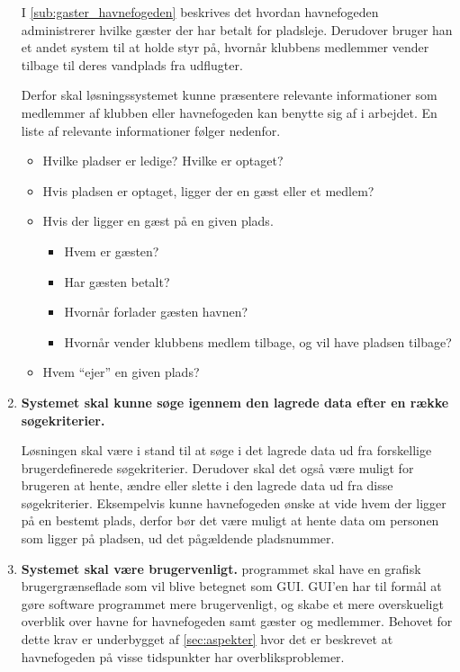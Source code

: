 \begin{enumerate}
  I \cref{sub:gaster_havnefogeden} beskrives det hvordan havnefogeden administrerer hvilke gæster der har betalt for pladsleje. Derudover bruger han et andet system til at holde styr på, hvornår klubbens medlemmer vender tilbage til deres vandplads fra udflugter.

  Derfor skal løsningssystemet kunne præsentere relevante informationer som medlemmer af klubben eller havnefogeden kan benytte sig af i arbejdet. En liste af relevante informationer følger nedenfor.

  \begin{itemize}
  \item Hvilke pladser er ledige? Hvilke er optaget?
  \item Hvis pladsen er optaget, ligger der en gæst eller et medlem?
  \item Hvis der ligger en gæst på en given plads.
    \begin{itemize}
      \item Hvem er gæsten?
      \item Har gæsten betalt?
      \item Hvornår forlader gæsten havnen?
      \item Hvornår vender klubbens medlem tilbage, og vil have pladsen tilbage?
    \end{itemize}
  \item Hvem \enquote{ejer} en given plads?
  \end{itemize}

\item \label{itm:soege} \textbf{Systemet skal kunne søge igennem den lagrede data efter en række søgekriterier.}

  Løsningen skal være i stand til at søge i det lagrede data ud fra forskellige brugerdefinerede søgekriterier. Derudover skal det også være muligt for brugeren at hente, ændre eller slette i den lagrede data ud fra disse søgekriterier. Eksempelvis kunne havnefogeden ønske at vide hvem der ligger på en bestemt plads, derfor bør det være muligt at hente data om personen som ligger på pladsen, ud det pågældende pladsnummer.
  
\item \label{itm:gui} \textbf{Systemet skal være brugervenligt.}  
    programmet skal have en grafisk brugergrænseflade som vil blive betegnet som GUI. GUI'en har til formål at gøre software programmet mere brugervenligt, og skabe et mere overskueligt overblik over havne for havnefogeden samt gæster og medlemmer. Behovet for dette krav er underbygget af \cref{sec:aspekter} hvor det er beskrevet at havnefogeden på visse tidspunkter har overbliksproblemer.


\end{enumerate}
